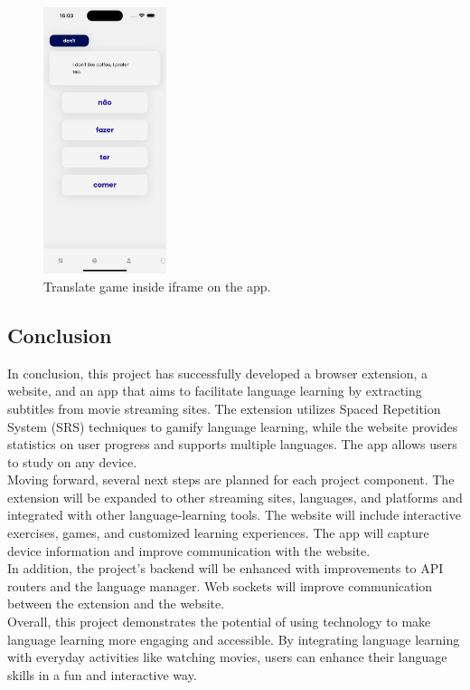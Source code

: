 \documentclass[12pt]{article}
\begin{document}
  \begin{figure}[!h]
    \centering
    \caption{
     Translate game inside iframe on the app.
    }
    \label{fig:app6}
    \includegraphics[width=0.32\textwidth]{assets/19.png}
  \end{figure}

\newpage
\subsection{Conclusion}
In conclusion, this project has successfully developed a browser extension, a website, and an app that aims to facilitate language learning by extracting subtitles from movie streaming sites. The extension utilizes Spaced Repetition System (SRS) techniques to gamify language learning, while the website provides statistics on user progress and supports multiple languages. The app allows users to study on any device. \\
Moving forward, several next steps are planned for each project component. The extension will be expanded to other streaming sites, languages, and platforms and integrated with other language-learning tools. The website will include interactive exercises, games, and customized learning experiences. The app will capture device information and improve communication with the website. \\
In addition, the project's backend will be enhanced with improvements to API routers and the language manager. Web sockets will improve communication between the extension and the website. \\
Overall, this project demonstrates the potential of using technology to make language learning more engaging and accessible. By integrating language learning with everyday activities like watching movies, users can enhance their language skills in a fun and interactive way.
\end{document}
